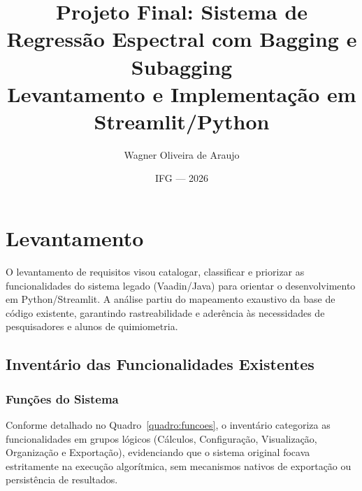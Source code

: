 \documentclass[12pt,a4paper]{article}
\begin{document}
\title{\textbf{Projeto Final: Sistema de Regressão Espectral com Bagging e Subagging}\\
\small Levantamento e Implementação em Streamlit/Python}
\author{Wagner Oliveira de Araujo}
\date{IFG --- 2026}
\maketitle
\thispagestyle{empty}

\newpage
\tableofcontents
\newpage
\section{Levantamento}

O levantamento de requisitos visou catalogar, classificar e priorizar as funcionalidades do sistema legado (Vaadin/Java) para orientar o desenvolvimento em Python/Streamlit. A análise partiu do mapeamento exaustivo da base de código existente, garantindo rastreabilidade e aderência às necessidades de pesquisadores e alunos de quimiometria.

\subsection{Inventário das Funcionalidades Existentes}

\subsubsection{Funções do Sistema}

Conforme detalhado no Quadro~\ref{quadro:funcoes}, o inventário categoriza as funcionalidades em grupos lógicos (Cálculos, Configuração, Visualização, Organização e Exportação), evidenciando que o sistema original focava estritamente na execução algorítmica, sem mecanismos nativos de exportação ou persistência de resultados.
\end{document}

